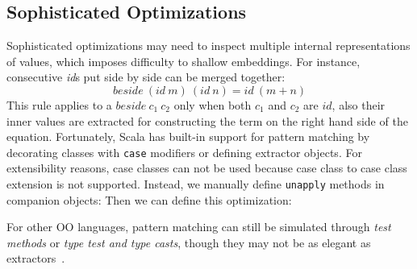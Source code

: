 \subsection{Sophisticated Optimizations}
Sophisticated optimizations may need to inspect multiple internal
representations of values, which imposes difficulty to shallow embeddings.
For instance, consecutive \emph{id}s put side by side can be merged together:
$$
beside\ (id\ m)\ (id\ n) = id\ (m + n)
$$
This rule applies to a $beside\ c_1\ c_2$ only when both $c_1$ and $c_2$ are
$id$, also their inner values are extracted for constructing the term
on the right hand side of the equation.
Fortunately, Scala has built-in support for pattern matching by decorating
classes with \lstinline{case} modifiers or defining extractor objects.
For extensibility reasons, case classes can not be used
because case class to case class extension is not supported.
Instead, we manually define \lstinline{unapply} methods in companion
objects:
Then we can define this optimization:

For other OO languages, pattern matching can still be simulated through \emph{test methods} or \emph{type test and type casts},
though they may not be as elegant as extractors~\cite{emir2007matching}.

